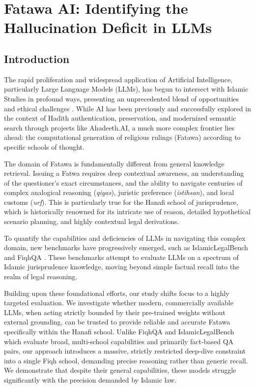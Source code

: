 \chapter{Fatawa AI: Identifying the Hallucination Deficit in LLMs}
\label{chap:Fatawa_AI:_Identifying_the_Hallucination_Deficit_in_LLMs}

\section{Introduction}

The rapid proliferation and widespread application of Artificial Intelligence, particularly Large Language Models (LLMs), has begun to intersect with Islamic Studies in profound ways, presenting an unprecedented blend of opportunities and ethical challenges \cite{islamicEval2025}. While AI has been previously and successfully explored in the context of Hadith authentication, preservation, and modernized semantic search through projects like Ahadeeth.AI, a much more complex frontier lies ahead: the computational generation of religious rulings (Fatawa) according to specific schools of thought. 

The domain of Fatawa is fundamentally different from general knowledge retrieval. Issuing a Fatwa requires deep contextual awareness, an understanding of the questioner's exact circumstances, and the ability to navigate centuries of complex analogical reasoning (\textit{qiyas}), juristic preference (\textit{istihsan}), and local customs (\textit{urf}). This is particularly true for the Hanafi school of jurisprudence, which is historically renowned for its intricate use of reason, detailed hypothetical scenario planning, and highly contextual legal derivations.

To quantify the capabilities and deficiencies of LLMs in navigating this complex domain, new benchmarks have progressively emerged, such as IslamicLegalBench \cite{elmahjub2026islamiclegalbench} and FiqhQA \cite{atif2025fiqhqa}. These benchmarks attempt to evaluate LLMs on a spectrum of Islamic jurisprudence knowledge, moving beyond simple factual recall into the realm of legal reasoning.

Building upon these foundational efforts, our study shifts focus to a highly targeted evaluation. We investigate whether modern, commercially available LLMs, when acting strictly bounded by their pre-trained weights without external grounding, can be trusted to provide reliable and accurate Fatawa specifically within the Hanafi school. Unlike FiqhQA and IslamicLegalBench which evaluate broad, multi-school capabilities and primarily fact-based QA pairs, our approach introduces a massive, strictly restricted deep-dive constraint into a single Fiqh school, demanding precise reasoning rather than generic recall. We demonstrate that despite their general capabilities, these models struggle significantly with the precision demanded by Islamic law.

